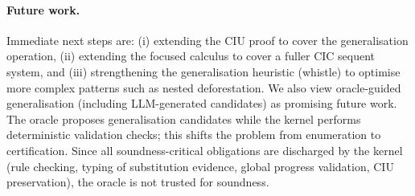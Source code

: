 \paragraph{Future work.}
Immediate next steps are: (i) extending the CIU proof to cover the generalisation operation, (ii) extending the focused calculus to cover a fuller CIC sequent system, and (iii) strengthening the generalisation heuristic (whistle) to optimise more complex patterns such as nested deforestation.
We also view oracle-guided generalisation (including LLM-generated candidates) as promising future work. The oracle proposes generalisation candidates while the kernel performs deterministic validation checks; this shifts the problem from enumeration to certification. Since all soundness-critical obligations are discharged by the kernel (rule checking, typing of substitution evidence, global progress validation, CIU preservation), the oracle is not trusted for soundness.
